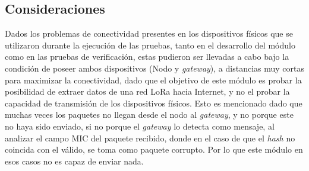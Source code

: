 \begin{justify}
\subsection{Consideraciones}
Dados los problemas de conectividad presentes en los dispositivos físicos que se utilizaron durante la ejecución de las pruebas, tanto en el desarrollo del módulo como en las pruebas  de verificación, estas pudieron ser llevadas a cabo bajo la condición de poseer ambos dispositivos (Nodo y \textit{gateway}), a distancias muy cortas para maximizar la conectividad, dado que el objetivo de este módulo es probar la posibilidad de extraer datos de una red LoRa hacia Internet, y no el probar la capacidad de transmisión de los dispositivos físicos. Esto es mencionado dado que muchas veces los paquetes no llegan desde el nodo al \textit{gateway}, y no porque este no haya sido enviado, si no porque el \textit{gateway} lo detecta como mensaje, al analizar el campo MIC del paquete recibido, donde en el caso de que el \textit{hash} no coincida con el válido, se toma como paquete corrupto. Por lo que este módulo en esos casos no es capaz de enviar nada.

\end{justify}

